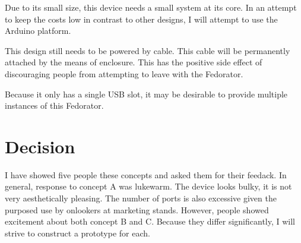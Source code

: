             Due to its small size, this device needs a small system at its core.  In an attempt to keep the costs low in contrast to other designs, I will attempt to use the Arduino platform.
            
            This design still needs to be powered by cable.  This cable will be permanently attached by the means of enclosure.  This has the positive side effect of discouraging people from attempting to leave with the Fedorator.
            
            Because it only has a single USB slot, it may be desirable to provide multiple instances of this Fedorator.
            \newpage
            
    \section{Decision}
        I have showed five people these concepts and asked them for their feedack.  In general, response to concept A was lukewarm.  The device looks bulky, it is not very aesthetically pleasing.  The number of ports is also excessive given the purposed use by onlookers at marketing stands.  However, people showed excitement about both concept B and C.  Because they differ significantly, I will strive to construct a prototype for each.

